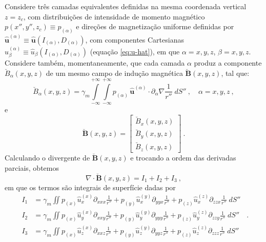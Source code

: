 Considere três camadas equivalentes definidas na mesma coordenada vertical $z = z_{c}$, 
com distribuições de intensidade de momento magnético 
$p(x'', y'', z_{c}) \equiv p_{(\alpha)}$ e direções de magnetização uniforme definidas por 
$\hat{\mathbf{u}}^{(\alpha)} \equiv \hat{\mathbf{u}}(I_{(\alpha)}, D_{(\alpha)})$,
com componentes Cartesianas $\hat{u}^{(\alpha)}_{\beta} \equiv \hat{u}_{\beta}(I_{(\alpha)}, D_{(\alpha)})$ 
(equação \ref{eq:u-hat}), em que $\alpha = x, y, z$, $\beta = x, y, z$. 
Considere também, momentaneamente, que cada camada $\alpha$ produz a componente 
$\breve{B}_{\alpha}(x, y, z)$ de um mesmo campo de indução magnética $\breve{\mathbf{B}}(x, y, z)$, 
tal que:
\begin{equation}
\breve{B}_{\alpha}(x, y, z) = \gamma_{m} \int\limits_{-\infty}^{+\infty}\int\limits_{-\infty}^{+\infty} 
p_{(\alpha)} \, \hat{\mathbf{u}}^{(\alpha)} \cdot \partial_{\alpha} \nabla \frac{1}{r''} \; dS'' 
\: , \quad \alpha = x, y, z \: ,
\label{eq:B-alpha-3layers}
\end{equation}
e
\begin{equation}
\breve{\mathbf{B}}(x, y, z) = \begin{bmatrix}
\breve{B}_{x}(x, y, z) \\
\breve{B}_{y}(x, y, z) \\
\breve{B}_{z}(x, y, z)
\end{bmatrix} \: .
\label{eq:B-3layers}
\end{equation}
Calculando o divergente de $\breve{\mathbf{B}}(x, y, z)$ 
e trocando a ordem das derivadas parciais, obtemos 
\begin{equation}
\nabla \cdot \breve{\mathbf{B}}(x, y, z) = I_{1} + I_{2} + I_{3} \: ,
\label{eq:divergent-layer}
\end{equation}
em que os termos são integrais de superfície dadas por
\begin{equation*}
\begin{split}
I_{1} &= \gamma_{m} \iint
p_{(x)} \hat{u}^{(x)}_{x} \partial_{xxx} \frac{1}{r''} +
p_{(y)} \hat{u}^{(y)}_{x} \partial_{yyx} \frac{1}{r''} +
p_{(z)} \hat{u}^{(z)}_{x} \partial_{zzx} \frac{1}{r''} \; dS'' \\
I_{2} &= \gamma_{m} \iint
p_{(x)} \hat{u}^{(x)}_{y} \partial_{xxy} \frac{1}{r''} +
p_{(y)} \hat{u}^{(y)}_{y} \partial_{yyy} \frac{1}{r''} +
p_{(z)} \hat{u}^{(z)}_{y} \partial_{zzy} \frac{1}{r''} \; dS'' \\
I_{3} &= \gamma_{m} \iint
p_{(x)} \hat{u}^{(x)}_{z} \partial_{xxz} \frac{1}{r''} +
p_{(y)} \hat{u}^{(y)}_{z} \partial_{yyz} \frac{1}{r''} +
p_{(z)} \hat{u}^{(z)}_{z} \partial_{zzz} \frac{1}{r''} \; dS''
\end{split} \:\: .
\end{equation*}
